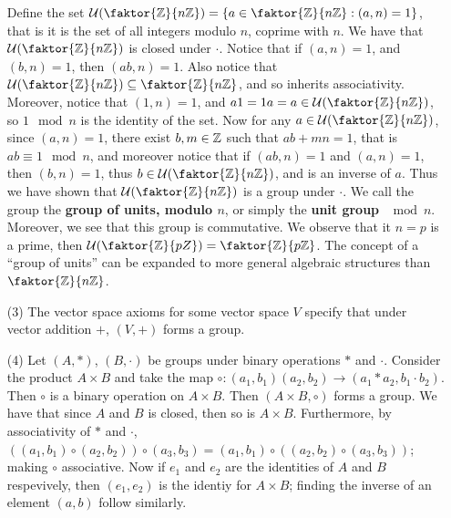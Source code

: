 \begin{example}
\begin{enumerate}
      Define the set $\Uc{(\faktor{\Z}{n\Z})}=\{a \in \faktor{\Z}{n\Z} : (a,n)=1\}$,
      that is it is the set of all integers modulo $n$, coprime with $n$. We have
      that $\Uc{(\faktor{\Z}{n\Z})}$ is closed under $\cdot$. Notice that if
      $(a,n)=1$, and $(b,n)=1$, then $(ab,n)=1$. Also notice that
      $\Uc{(\faktor{\Z}{n\Z})} \subseteq \faktor{\Z}{n\Z}$, and so inherits
      associativity. Moreover, notice that $(1,n)=1$, and $a1=1a=a \in
      \Uc{(\faktor{\Z}{n\Z})}$, so $1 \mod{n}$ is the identity of the set. Now for
      any $a \in \Uc{(\faktor{\Z}{n\Z})}$, since $(a,n)=1$, there exist $b,m \in
      \mathbb{Z}$ such that $ab+mn=1$, that is $ab \equiv 1 \mod{n}$, and moreover notice
      that if $(ab,n)=1$ and $(a,n)=1$, then $(b,n)=1$, thus $b \in
      \Uc{(\faktor{\Z}{n\Z})}$, and is an inverse of $a$. Thus we have shown that
      $\Uc{(\faktor{\Z}{n\Z})}$ is a group under $\cdot$. We call the group the
      \textbf{group of units, modulo $n$}, or simply the \textbf{unit group $\mod{n}$}.
      Moreover, we see that this group is commutative. We observe that it
      $n=p$ is a prime, then  $\Uc{(\faktor{\Z}{pZ})}=\faktor{\Z}{p\Z}$. The concept
      of a ``group of units'' can be expanded to more general algebraic structures
      than $\faktor{\Z}{n\Z}$.

    \item[(3)] The vector space axioms for some vector space $V$ specify
      that under vector addition  $+$,  $(V,+)$ forms a group.

    \item[(4)] Let $(A, \ast)$, $(B,\cdot)$ be groups under binary
      operations $\ast$ and  $\cdot$. Consider the product $A \times B$
      and take the map $\circ:(a_1,b_1)(a_2,b_2) \rightarrow (a_1 \ast a_2, b_1
      \cdot b_2)$. Then $\circ$ is a binary operation on  $A \times B$.
      Then  $(A \times B, \circ)$ forms a group. We have that since $A$
      and  $B$ is closed, then so is  $A \times B$. Furthermore, by
      associativity of  $\ast$ and  $\cdot$,  $((a_1,b_1) \circ (a_2,b_2))
      \circ (a_3,b_3)=(a_1,b_1) \circ ((a_2,b_2) \circ (a_3,b_3))$; making
      $\circ$ associative. Now if  $e_1$ and $e_2$ are the identities of
      $A$ and  $B$ respevively, then  $(e_1,e_2)$ is the identiy for $A
      \times B$; finding the inverse of an element  $(a,b)$ follow
      similarly.
  \end{enumerate}
\end{example}

